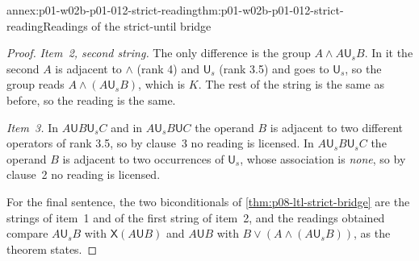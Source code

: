 \begin{annexitem}{annex:p01-w02b-p01-012-strict-reading}{thm:p01-w02b-p01-012-strict-reading}{Readings of the strict-until bridge}
\begin{proof}
\emph{Item~2, second string.}  The only difference is the group
\(A\land A\mathbin{\mathsf U_s}B\).  In it the second \(A\) is adjacent to
\(\land\) (rank 4) and \(\mathsf U_s\) (rank 3.5) and goes to
\(\mathsf U_s\), so the group reads \(A\land(A\mathbin{\mathsf U_s}B)\),
which is \(K\).  The rest of the string is the same as before, so the
reading is the same.

\emph{Item~3.}  In \(A\mathbin{\mathsf U}B\mathbin{\mathsf U_s}C\) and in
\(A\mathbin{\mathsf U_s}B\mathbin{\mathsf U}C\) the operand \(B\) is
adjacent to two different operators of rank 3.5, so by clause~3 no reading
is licensed.  In \(A\mathbin{\mathsf U_s}B\mathbin{\mathsf U_s}C\) the
operand \(B\) is adjacent to two occurrences of \(\mathsf U_s\), whose
association is \emph{none}, so by clause~2 no reading is licensed.

For the final sentence, the two biconditionals of
\cref{thm:p08-ltl-strict-bridge} are the strings of item~1 and of the
first string of item~2, and the readings obtained compare
\(A\mathbin{\mathsf U_s}B\) with \(\mathsf X(A\mathbin{\mathsf U}B)\) and
\(A\mathbin{\mathsf U}B\) with
\(B\lor(A\land(A\mathbin{\mathsf U_s}B))\), as the theorem states.
\end{proof}
\end{annexitem}

